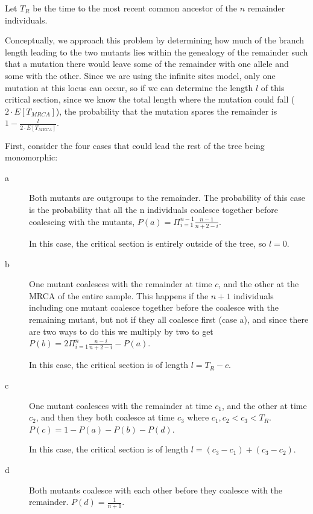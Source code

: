 \documentclass{article}
\begin{document}
Let $T_{R}$ be the time to the most recent common ancestor of the $n$ remainder
individuals.

Conceptually, we approach this problem by determining how much of the branch
length leading to the two mutants lies within the genealogy of the remainder
such that a mutation there would leave some of the remainder with one allele and
some with the other.  Since we are using the infinite sites model, only one
mutation at this locus can occur, so if we can determine the length $l$ of this
critical section, since we know the total length where the mutation could fall
($2 \cdot E[T_{MRCA}]$), the probability that the mutation spares the remainder is $1 -
\frac{l}{2 \cdot E[T_{MRCA}]}$.

First, consider the four cases that could lead the rest of the tree being
monomorphic:
\begin{description}
\item[a] Both mutants are outgroups to the remainder.  The probability of this
case is the probability that all the n individuals coalesce together before
coalescing with the mutants, $P(a) = \Pi_{i=1}^{n-1}\frac{n-1}{n+2-i}$.
\vspace{1in}

In this case, the critical section is entirely outside of the tree, so $l=0$.

\item[b] One mutant coalesces with the remainder at time $c$, and the other at
the MRCA of the entire sample.  This happens if the $n+1$ individuals including
one mutant coalesce together before the coalesce with the remaining mutant, but
not if they all coalesce first (case a), and since there are two ways to do this
we multiply by two to get $P(b) = 2 \Pi_{i=1}^n\frac{n-i}{n+2-i} - P(a)$.
\vspace{1in}

In this case, the critical section is of length $l = T_R - c$.

\item[c] One mutant coalesces with the remainder at time $c_1$, and the other at
time $c_2$, and then they both coalesce at time $c_3$ where $c_1, c_2< c_3 < T_R$.
$P(c) = 1 - P(a) - P(b) - P(d)$.
\vspace{1in}

In this case, the critical section is of length $l = (c_3 - c_1) + (c_3 - c_2)$.

\item[d] Both mutants coalesce with each other before they coalesce with the
remainder.  $P(d) = \frac{1}{n+1}$.
\vspace{1in}


\end{description}
\end{document}
